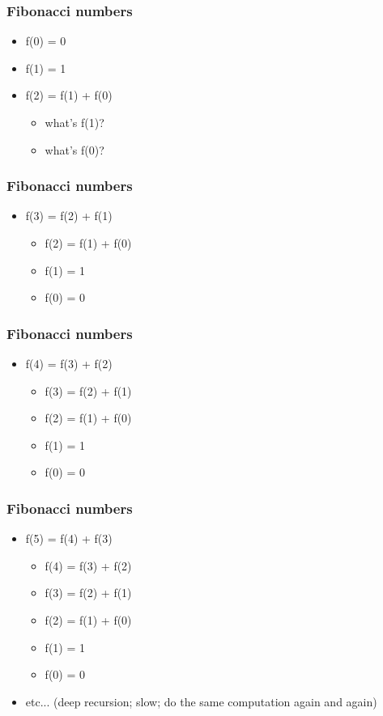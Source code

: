\documentclass{beamer}
\begin{document}
\begin{frame}
\frametitle{Fibonacci numbers}
\begin{itemize}
\item f(0) = 0
\item f(1) = 1
\item f(2) = f(1) + f(0)
\begin{itemize}
\item what's f(1)?
\item what's f(0)?
\end{itemize}
\end{itemize}
\end{frame}

\begin{frame}
\frametitle{Fibonacci numbers}
\begin{itemize}
\item f(3) = f(2) + f(1)
\begin{itemize}
\item f(2) = f(1) + f(0)
\item f(1) = 1
\item f(0) = 0
\end{itemize}
\end{itemize}
\end{frame}

\begin{frame}
\frametitle{Fibonacci numbers}
\begin{itemize}
\item f(4) = f(3) + f(2)
\begin{itemize}
\item f(3) = f(2) + f(1)
\item f(2) = f(1) + f(0)
\item f(1) = 1
\item f(0) = 0
\end{itemize}
\end{itemize}
\end{frame}

\begin{frame}
\frametitle{Fibonacci numbers}
\begin{itemize}
\item f(5) = f(4) + f(3)
\begin{itemize}
\item f(4) = f(3) + f(2)
\item f(3) = f(2) + f(1)
\item f(2) = f(1) + f(0)
\item f(1) = 1
\item f(0) = 0
\end{itemize}
\item etc... (deep recursion; slow; do the same computation again and again)
\end{itemize}
\end{frame}
\end{document}

